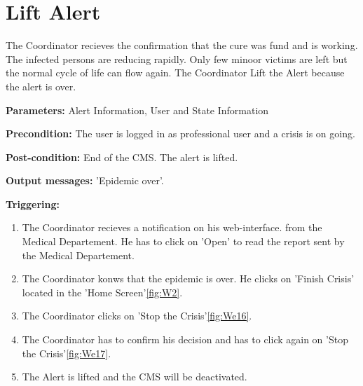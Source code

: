 \section{Lift Alert}
\label{operation:LiftAlert}
The Coordinator recieves the confirmation that the cure was fund and is
working. The infected persons are reducing rapidly. Only few minoor victims
are left but the normal cycle of life can flow again. The Coordinator Lift the
Alert because the alert is over.\\
\begin{description}
\item \textbf{Parameters:} Alert Information, User and State Information
\item \textbf{Precondition:} The user is logged in as professional user and
a crisis is on going.
\item \textbf{Post-condition:} End of the CMS. The alert is lifted.
\item \textbf{Output messages:} 'Epidemic over'.
\item \textbf{Triggering:}
\begin{enumerate}
\item The Coordinator recieves a notification on his web-interface.
 from the Medical Departement. He has to click on 'Open' to read
the report sent by the Medical Departement.
\item The Coordinator konws that the epidemic is over. He clicks on 'Finish
Crisis' located in the 'Home Screen'\ref{fig:W2}.
\item The Coordinator clicks on 'Stop the Crisis'\ref{fig:We16}.
\item The Coordinator has to confirm his decision and has to click again on
'Stop the Crisis'\ref{fig:We17}.
\item The Alert is lifted and the CMS will be deactivated.
\end{enumerate}
\end{description}

